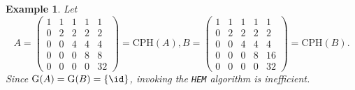 \documentclass[reqno, 12pt]{article}
\theoremstyle{mydefinition}
\theoremstyle{myremark}
\newtheorem{exa}[thm]{Example}
\numberwithin{algorithm}{section}
\begin{document}
\begin{exa}
Let
 $$
 A=\begin{pmatrix}
1 & 1 & 1 & 1 & 1
\\0 & 2 & 2 & 2 & 2
\\0 & 0 & 4 & 4 & 4
\\0 & 0 & 0 & 8 & 8
\\0 & 0 & 0 & 0 & 32
\end{pmatrix} = \mathrm{CPH}(A),
B=\begin{pmatrix}
1 & 1 & 1 & 1 & 1
\\ 0 & 2 & 2 & 2 & 2
\\0 & 0 & 4 & 4 & 4
\\0 & 0 & 0 & 8 & 16
\\ 0 & 0 & 0 & 0 & 32
\end{pmatrix}= \mathrm{CPH}(B).
$$ Since $\mathrm{G}(A)=\mathrm{G}(B)=\{\id\}$, invoking the \texttt{HEM} algorithm is inefficient.


\end{exa}
\end{document}
